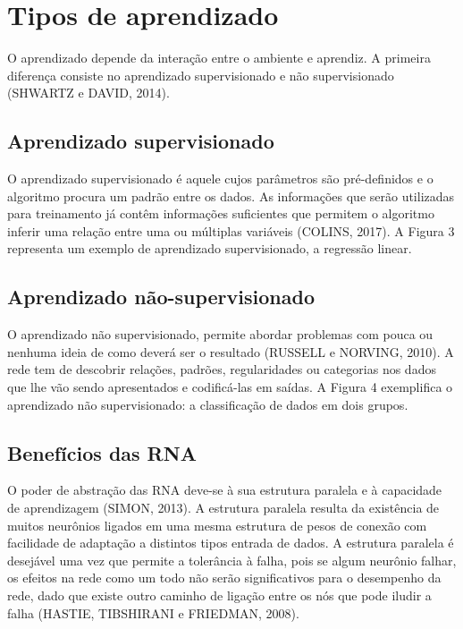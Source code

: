 \section{Tipos de aprendizado}

O aprendizado depende da interação entre o ambiente e aprendiz. A primeira diferença consiste no aprendizado supervisionado e não supervisionado (SHWARTZ e DAVID, 2014).

\subsection{Aprendizado supervisionado}

O aprendizado supervisionado é aquele cujos parâmetros são pré-definidos e o algoritmo procura um padrão entre os dados. As informações que serão utilizadas para treinamento já contêm informações suficientes que permitem o algoritmo inferir uma relação entre uma ou múltiplas variáveis (COLINS, 2017). A Figura 3 representa um exemplo de aprendizado supervisionado, a regressão linear.

\subsection{Aprendizado não-supervisionado}

O aprendizado não supervisionado, permite abordar problemas com pouca ou nenhuma ideia de como deverá ser o resultado (RUSSELL e NORVING, 2010). A rede tem de descobrir relações, padrões, regularidades ou categorias nos dados que lhe vão sendo apresentados e codificá-las em saídas. A Figura 4 exemplifica o aprendizado não supervisionado: a classificação de dados em dois grupos.

\subsection{Benefícios das RNA}

O poder de abstração das RNA deve-se à sua estrutura paralela e à capacidade de aprendizagem (SIMON, 2013). A estrutura paralela resulta da existência de muitos neurônios ligados em uma mesma estrutura de pesos de conexão com facilidade de adaptação a distintos tipos entrada de dados. A estrutura paralela é desejável uma vez que permite a tolerância à falha, pois se algum neurônio falhar, os efeitos na rede como um todo não serão significativos para o desempenho da rede, dado que existe outro caminho de ligação entre os nós que pode iludir a falha (HASTIE, TIBSHIRANI e FRIEDMAN, 2008).

